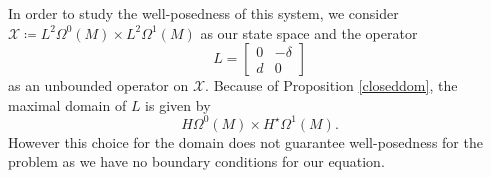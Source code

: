 \documentclass{ifacconf}
\newcommand{\drh}[2]{\Omega^{#2}(#1)}
\begin{document}
In order to study the well-posedness of this system, we consider $\mathcal{X}\coloneqq L^2\drh{M}{0}\times L^2\drh{M}{1}$ as our state space and the operator
\[
    L=  \begin{bmatrix}
        0 & -\delta \\
        d & 0  
        \end{bmatrix}
\]
as an unbounded operator on $\mathcal{X}$. 
Because of Proposition \ref{closeddom}, the maximal domain of $L$ is given by
\begin{equation}\label{dom}
    H\drh{M}{0}\times H^{\star}\drh{M}{1}.
\end{equation}
However this choice for the domain does not guarantee well-posedness for the problem as we have no boundary conditions for our equation.\\
\end{document}
